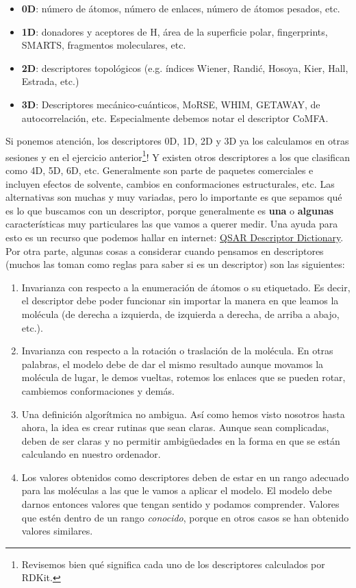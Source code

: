 \documentclass[10pt,letterpaper]{article}
\begin{document}
\begin{itemize}
\item \textbf{0D}: n\'umero de \'atomos, n\'umero de enlaces, n\'umero de \'atomos pesados, etc.
\item \textbf{1D}: donadores y aceptores de H, \'area de la superficie polar, fingerprints, SMARTS, fragmentos moleculares, etc.
\item \textbf{2D}: descriptores topol\'ogicos (e.g. \'indices Wiener, Randi\'c, Hosoya, Kier, Hall, Estrada, etc.)
\item \textbf{3D}: Descriptores mec\'anico-cu\'anticos, MoRSE, WHIM, GETAWAY, de autocorrelaci\'on, etc. Especialmente debemos notar el descriptor CoMFA.
\end{itemize}

Si ponemos atenci\'on, los descriptores 0D, 1D, 2D y 3D ya los calculamos en otras sesiones y en el ejercicio anterior\footnote{Revisemos bien qu\'e significa cada uno de los descriptores calculados por RDKit.}! Y existen otros descriptores a los que clasifican como 4D, 5D, 6D, etc. Generalmente son parte de paquetes comerciales e incluyen efectos de solvente, cambios en conformaciones estructurales, etc. Las alternativas son muchas y muy variadas, pero lo importante es que sepamos qu\'e es lo que buscamos con un descriptor, porque generalmente es \textbf{una} o \textbf{algunas} caracter\'isticas muy particulares las que vamos a querer medir. Una ayuda para esto es un recurso que podemos hallar en internet: \href{http://qsar.sourceforge.net/dicts/qsar-descriptors/index.xhtml}{QSAR Descriptor Dictionary}. Por otra parte, algunas cosas a considerar cuando pensamos en descriptores (muchos las toman como reglas para saber si es un descriptor) son las siguientes:

\begin{enumerate}
\item Invarianza con respecto a la enumeraci\'on de \'atomos o su etiquetado. Es decir, el descriptor debe poder funcionar sin importar la manera en que leamos la mol\'ecula (de derecha a izquierda, de izquierda a derecha, de arriba a abajo, etc.).
\item Invarianza con respecto a la rotaci\'on o traslaci\'on de la mol\'ecula. En otras palabras, el modelo debe de dar el mismo resultado aunque movamos la mol\'ecula de lugar, le demos vueltas, rotemos los enlaces que se pueden rotar, cambiemos conformaciones y dem\'as.
\item Una definici\'on algor\'itmica no ambigua. As\'i como hemos visto nosotros hasta ahora, la idea es crear rutinas que sean claras. Aunque sean complicadas, deben de ser claras y no permitir ambig\"uedades en la forma en que se est\'an calculando en nuestro ordenador.
\item Los valores obtenidos como descriptores deben de estar en un rango adecuado para las mol\'eculas a las que le vamos a aplicar el modelo. El modelo debe darnos entonces valores que tengan sentido y podamos comprender. Valores que est\'en dentro de un rango \emph{conocido}, porque en otros casos se han obtenido valores similares.
\end{enumerate}
\end{document}
